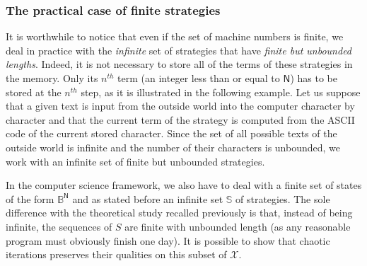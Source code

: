 \subsubsection{The practical case of finite strategies}
\label{subsection:The particular case of regularity}

It is worthwhile to notice that even if the set of machine numbers is finite, we deal in practice with the \emph{infinite} set of strategies that have \emph{finite but unbounded lengths}.
Indeed, it is not necessary to store all of the terms of these strategies in the memory.
Only its $n^{th}$ term (an integer less than or equal to $\mathsf{N}$) has to be stored at the $n^{th}$ step, as it is illustrated in the following example.
Let us suppose that a given text is input from the outside world into the computer character by character and that the current term of the strategy is computed from the ASCII code of the current stored character. Since the set of all possible texts of the outside world is infinite and the number of their characters is unbounded, we work with an infinite set of finite but unbounded strategies.

In the computer science framework, we also have to deal with a finite set of states 
of the form $\mathds{B}^\mathsf{N}$ and as stated before an infinite set $\mathbb{S}$ 
of strategies. The sole difference with the theoretical study recalled previously is 
that, instead of being infinite, the sequences of $S$ are finite with unbounded length
(as any reasonable program must obviously finish one day). It is possible to show
that chaotic iterations preserves their qualities on this subset of $\mathcal{X}$.





































































